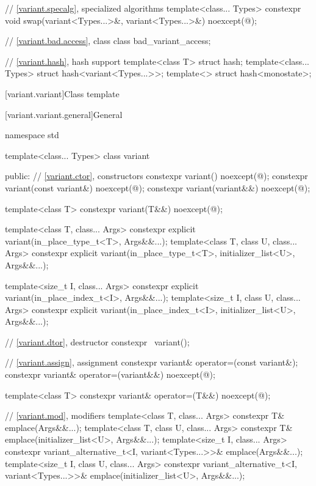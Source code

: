 \begin{codeblock}
{  // \ref{variant.specalg}, specialized algorithms
  template<class... Types>
    constexpr void swap(variant<Types...>&, variant<Types...>&) noexcept(@\seebelow@);

  // \ref{variant.bad.access}, class 
  class bad_variant_access;

  // \ref{variant.hash}, hash support
  template<class T> struct hash;
  template<class... Types> struct hash<variant<Types...>>;
  template<> struct hash<monostate>;
}
\end{codeblock}

[variant.variant]{Class template }%
%

[variant.variant.general]{General}

\begin{codeblock}
namespace std {
  template<class... Types>
  class variant {
  public:
    // \ref{variant.ctor}, constructors
    constexpr variant() noexcept(@\seebelow@);
    constexpr variant(const variant&) noexcept(@\seebelow@);
    constexpr variant(variant&&) noexcept(@\seebelow@);

    template<class T>
      constexpr variant(T&&) noexcept(@\seebelow@);

    template<class T, class... Args>
      constexpr explicit variant(in_place_type_t<T>, Args&&...);
    template<class T, class U, class... Args>
      constexpr explicit variant(in_place_type_t<T>, initializer_list<U>, Args&&...);

    template<size_t I, class... Args>
      constexpr explicit variant(in_place_index_t<I>, Args&&...);
    template<size_t I, class U, class... Args>
      constexpr explicit variant(in_place_index_t<I>, initializer_list<U>, Args&&...);

    // \ref{variant.dtor}, destructor
    constexpr ~variant();

    // \ref{variant.assign}, assignment
    constexpr variant& operator=(const variant&);
    constexpr variant& operator=(variant&&) noexcept(@\seebelow@);

    template<class T> constexpr variant& operator=(T&&) noexcept(@\seebelow@);

    // \ref{variant.mod}, modifiers
    template<class T, class... Args>
      constexpr T& emplace(Args&&...);
    template<class T, class U, class... Args>
      constexpr T& emplace(initializer_list<U>, Args&&...);
    template<size_t I, class... Args>
      constexpr variant_alternative_t<I, variant<Types...>>& emplace(Args&&...);
    template<size_t I, class U, class... Args>
      constexpr variant_alternative_t<I, variant<Types...>>&
        emplace(initializer_list<U>, Args&&...);

}}
\end{codeblock}
